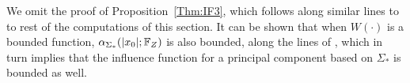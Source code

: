We omit the proof of Proposition~\ref{Thm:IF3}, which follows along similar lines to 
to rest of the computations of this section. It can be shown that when $W (\cdot)$ is a bounded function, $\alpha_{\Sigma_{*}} ( | x_{0} |; {\mathbb{F}}_{Z} )$ is also bounded, along the lines of \cite{ref:HuberBook81}, which in turn implies that the influence function for a principal component based on $\Sigma_{*}$ is bounded as well.


